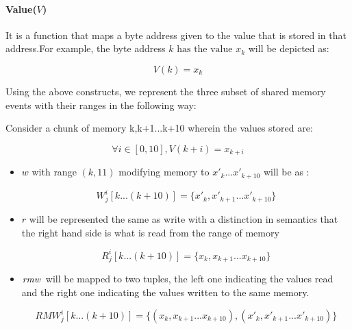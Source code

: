             
         \paragraph{Value($V$)}  
           It is a function that maps a byte address given to the value that is stored in that address.For example, the byte address $k \text{ has the value } x_k$ will be depicted as:
                
                \[V(k) = x_k\]
            
            
            Using the above constructs, we represent the three subset of shared memory events with their ranges in the following way:
            
            Consider a chunk of memory {k,k+1...k+10} wherein the values stored are:
            
                \[\forall i \in [0,10], V(k+i) = x_{k+i}\]
                
            \begin{itemize}
                \item $w$ with range $(k,11)$ modifying memory to ${x'_{k}}...{x'_{k+10}}$ will be as : 
                
                        \[{W^i_j}[k...(k+10)] = \{x'_{k}, x'_{k+1}...x'_{k + 10}\}\]
                
                \item $r$ will be represented the same as write with a distinction in semantics that the right hand side is what is read from the range of memory 
                
                        \[{R^i_j}[k...(k+10)] = \{x_{k}, x_{k+1}...x_{k + 10}\}\]
                
                \item $\textit{rmw}\,$ will be mapped to two tuples, the left one indicating the values read and the right one indicating the values written to the same memory. 
                
                        \[{RMW^i_j}[k...(k+10)] = \{(x_{k}, x_{k+1}...x_{k + 10}), (x{'}_{k}, x{'}_{k+1}...x{'}_{k + 10}) \}\]
                
            \end{itemize}
            
